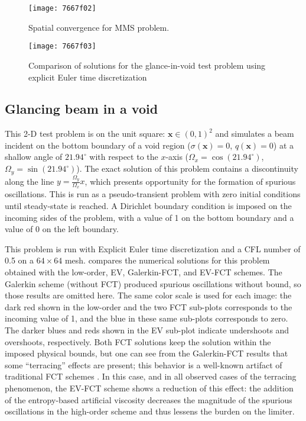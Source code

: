 \documentclass[xchauthor,chkrefs,fixeqskip,GCNS,amsmath,amsthm]{yjcphg}
\theoremstyle{remark}
\begin{document}
\begin{figure}
\texttt{[image: 7667f02]}
\caption{Spatial convergence for MMS problem.}
\label{fig:mms_sinx_ss}
\end{figure}

\begin{figure}
\texttt{[image: 7667f03]}
\caption{Comparison of solutions for the glance-in-void test problem using
explicit Euler time discretization}
\label{fig:glance_in_void_fe}
\end{figure}


\subsection{Glancing beam in a void}

This 2-D test problem is on the unit square: $\mathbf{x}\in(0,1)^{2}$
and simulates a beam incident on the bottom boundary of a void region
($\sigma(\mathbf{x})= 0$, $q(\mathbf{x})=0$) at a shallow angle of
$21.94^{\circ}$ with respect to the $x$-axis ($\Omega_{x}=\cos(21.94^{
\circ})$, $\Omega_{y}=\sin(21.94^{\circ})$). The exact solution of
this problem contains a discontinuity along the line $y = \frac{\Omega
_{y}}{\Omega_{x}}x$, which presents opportunity for the formation of
spurious oscillations. This is run as a pseudo-transient problem with
zero initial conditions until steady-state is reached. A Dirichlet
boundary condition is imposed on the incoming sides of the problem, with
a value of 1 on the bottom boundary and a value of 0 on the left
boundary.

This problem is run with Explicit Euler time discretization and a CFL
number of 0.5 on a $64\times64$ mesh.  compares the numerical solutions for this
problem obtained with the low-order, EV, Galerkin-FCT, and EV-FCT
schemes. The Galerkin scheme (without FCT) produced spurious
oscillations without bound, so those results are omitted here. The same
color scale is used for each image: the dark red shown in the low-order
and the two FCT sub-plots corresponds to the incoming value of 1, and
the blue in these same sub-plots corresponds to zero. The darker blues
and reds shown in the EV sub-plot indicate undershoots and overshoots,
respectively. Both FCT solutions keep the solution within the imposed
physical bounds, but one can see from the Galerkin-FCT results that some
``terracing'' effects are present; this behavior is a well-known
artifact of traditional FCT schemes \cite{kuzmin_FCT}. In this
case, and in all observed cases of the terracing phenomenon, the EV-FCT
scheme shows a reduction of this effect: the addition of the
entropy-based artificial viscosity decreases the magnitude of the
spurious oscillations in the high-order scheme and thus lessens the
burden on the limiter.
\end{document}
